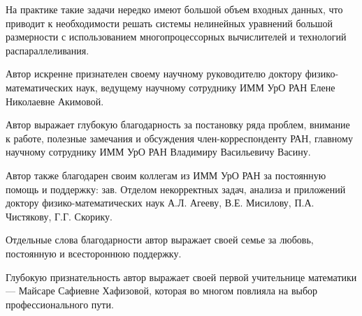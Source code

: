 \intro

%
%

\actualitysection
\actualitytext

На практике такие задачи нередко имеют большой объем входных данных, что приводит к необходимости решать системы нелинейных уравнений большой размерности с использованием многопроцессорных вычислителей и технологий распараллеливания.


\developmentsection
\developmenttext

\objectivesection
\objectivetext

\methodssection
\methodstext

\noveltysection
\noveltytext

{}


\approbationsection
\approbationtext

\pubsection
\pubtext

\contribsection
\contribtext

\structsection
\structtext

Автор искренне признателен своему научному руководителю доктору физико-математических наук, ведущему научному сотруднику ИММ УрО РАН Елене Николаевне Акимовой.

Автор выражает глубокую благодарность за постановку ряда проблем, внимание к работе, полезные замечания и обсуждения член-корреспонденту РАН, главному научному сотруднику ИММ УрО РАН Владимиру Васильевичу Васину.

Автор также благодарен своим коллегам из ИММ УрО РАН за постоянную помощь и поддержку: зав. Отделом некорректных задач, анализа и приложений доктору физико-математических наук А.Л. Агееву, В.Е. Мисилову, П.А. Чистякову, Г.Г. Скорику.

Отдельные слова благодарности автор выражает своей семье за любовь, постоянную и всестороннюю поддержку.

Глубокую признательность автор выражает своей первой учительнице математики --- Майсаре Сафиевне Хафизовой, которая во многом повлияла на выбор профессионального пути.


